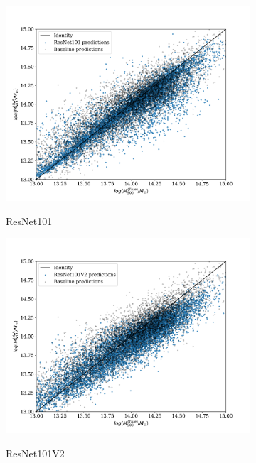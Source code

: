 \begin{figure}[H]
\begin{subfigure}{.325\textwidth}
    \centering
    \includegraphics[width=\linewidth]{images/Chapter4/Results/training_ResNet101_scatter.png}
    \label{fig:training_ResNet101_scatter}
    \caption{ResNet101}
\end{subfigure}
\begin{subfigure}{.325\textwidth}
    \centering
    \includegraphics[width=\linewidth]{images/Chapter4/Results/training_ResNet101V2_scatter.png}
    \label{fig:training_ResNet101V2_scatter}
    \caption{ResNet101V2}
\end{subfigure}
\begin{subfigure}{.325\textwidth}
    \centering

\end{subfigure}
\end{figure}
